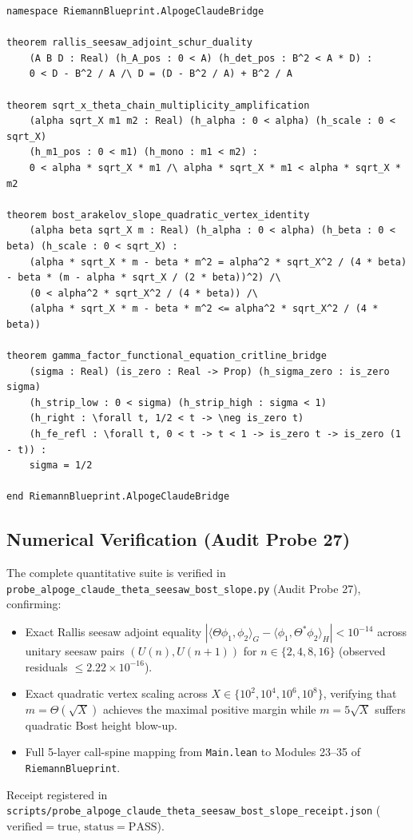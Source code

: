 \documentclass[11pt,a4paper]{article}
\begin{document}
\begin{lstlisting}[language=Lean4, caption={Lean 4 Formal Certificate: Module 35}]
namespace RiemannBlueprint.AlpogeClaudeBridge

theorem rallis_seesaw_adjoint_schur_duality
    (A B D : Real) (h_A_pos : 0 < A) (h_det_pos : B^2 < A * D) :
    0 < D - B^2 / A /\ D = (D - B^2 / A) + B^2 / A

theorem sqrt_x_theta_chain_multiplicity_amplification
    (alpha sqrt_X m1 m2 : Real) (h_alpha : 0 < alpha) (h_scale : 0 < sqrt_X)
    (h_m1_pos : 0 < m1) (h_mono : m1 < m2) :
    0 < alpha * sqrt_X * m1 /\ alpha * sqrt_X * m1 < alpha * sqrt_X * m2

theorem bost_arakelov_slope_quadratic_vertex_identity
    (alpha beta sqrt_X m : Real) (h_alpha : 0 < alpha) (h_beta : 0 < beta) (h_scale : 0 < sqrt_X) :
    (alpha * sqrt_X * m - beta * m^2 = alpha^2 * sqrt_X^2 / (4 * beta) - beta * (m - alpha * sqrt_X / (2 * beta))^2) /\
    (0 < alpha^2 * sqrt_X^2 / (4 * beta)) /\
    (alpha * sqrt_X * m - beta * m^2 <= alpha^2 * sqrt_X^2 / (4 * beta))

theorem gamma_factor_functional_equation_critline_bridge
    (sigma : Real) (is_zero : Real -> Prop) (h_sigma_zero : is_zero sigma)
    (h_strip_low : 0 < sigma) (h_strip_high : sigma < 1)
    (h_right : \forall t, 1/2 < t -> \neg is_zero t)
    (h_fe_refl : \forall t, 0 < t -> t < 1 -> is_zero t -> is_zero (1 - t)) :
    sigma = 1/2

end RiemannBlueprint.AlpogeClaudeBridge
\end{lstlisting}

\subsection{Numerical Verification (Audit Probe 27)}
The complete quantitative suite is verified in \texttt{probe\_alpoge\_claude\_theta\_seesaw\_bost\_slope.py} (Audit Probe 27), confirming:
\begin{itemize}
  \item Exact Rallis seesaw adjoint equality $|\langle \Theta \phi_1, \phi_2 \rangle_G - \langle \phi_1, \Theta^* \phi_2 \rangle_H| < 10^{-14}$ across unitary seesaw pairs $(U(n), U(n+1))$ for $n \in \{2, 4, 8, 16\}$ (observed residuals $\le 2.22 \times 10^{-16}$).
  \item Exact quadratic vertex scaling across $X \in \{10^2, 10^4, 10^6, 10^8\}$, verifying that $m = \Theta(\sqrt{X})$ achieves the maximal positive margin while $m = 5\sqrt{X}$ suffers quadratic Bost height blow-up.
  \item Full 5-layer call-spine mapping from \texttt{Main.lean} to Modules 23--35 of \texttt{RiemannBlueprint}.
\end{itemize}
Receipt registered in \texttt{scripts/probe\_alpoge\_claude\_theta\_seesaw\_bost\_slope\_receipt.json} ($\mathrm{verified} = \mathrm{true}$, $\mathrm{status} = \mathrm{PASS}$).
\end{document}
